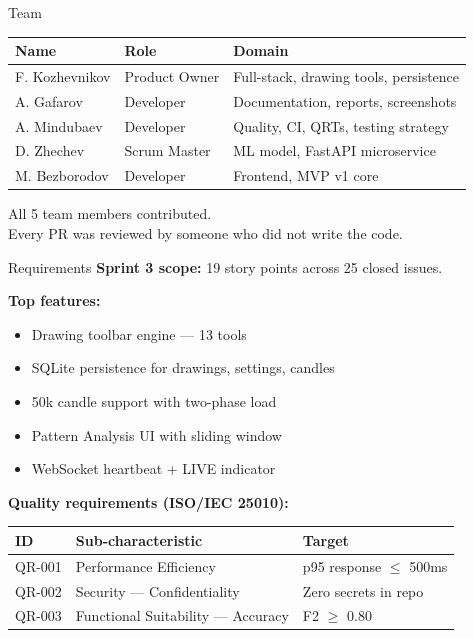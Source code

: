 \documentclass[11pt]{beamer}
\begin{document}
\begin{frame}{Team}
    \small
    \begin{tabular}{lll}
        \toprule
        \textbf{Name} & \textbf{Role} & \textbf{Domain} \\
        \midrule
        F. Kozhevnikov & Product Owner & Full-stack, drawing tools, persistence \\
        A. Gafarov & Developer & Documentation, reports, screenshots \\
        A. Mindubaev & Developer & Quality, CI, QRTs, testing strategy \\
        D. Zhechev & Scrum Master & ML model, FastAPI microservice \\
        M. Bezborodov & Developer & Frontend, MVP v1 core \\
        \bottomrule
    \end{tabular}

    \vspace{0.4cm}
    All 5 team members contributed. \\
    Every PR was reviewed by someone who did not write the code.
\end{frame}

\begin{frame}{Requirements}
    \textbf{Sprint 3 scope:} 19 story points across 25 closed issues.

    \vspace{0.3cm}
    \textbf{Top features:}
    \begin{itemize}
        \item Drawing toolbar engine --- 13 tools
        \item SQLite persistence for drawings, settings, candles
        \item 50k candle support with two-phase load
        \item Pattern Analysis UI with sliding window
        \item WebSocket heartbeat + LIVE indicator
    \end{itemize}

    \vspace{0.3cm}
    \textbf{Quality requirements (ISO/IEC 25010):}
    \begin{tabular}{lll}
        \toprule
        ID & Sub-characteristic & Target \\
        \midrule
        QR-001 & Performance Efficiency & p95 response $\leq$ 500ms \\
        QR-002 & Security --- Confidentiality & Zero secrets in repo \\
        QR-003 & Functional Suitability --- Accuracy & F2 $\geq$ 0.80 \\
        \bottomrule
    \end{tabular}
\end{frame}
\end{document}
